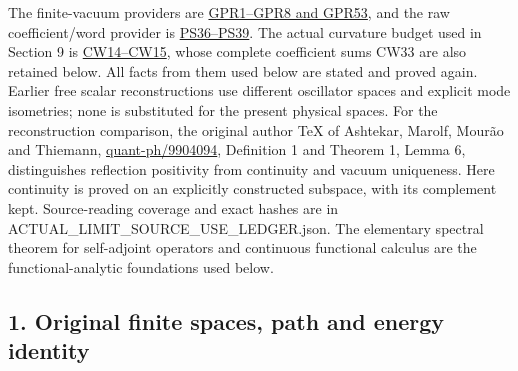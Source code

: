 \documentclass[11pt]{article}
\begin{document}
The finite-vacuum providers are \href{https://github.com/KokunoYumeto/yang-mills-interacting-workbench/blob/af1715c22ac52ba5fcc1d3768f2c6f0895de79ac/yang-mills/continuations/20261011-central-signs-shrinking-window/GLOBAL_PHYSICAL_RESPONSE.md}{GPR1–GPR8 and GPR53}, and the raw coefficient/word provider is \href{https://github.com/KokunoYumeto/yang-mills-interacting-workbench/blob/af1715c22ac52ba5fcc1d3768f2c6f0895de79ac/yang-mills/continuations/20261011-central-signs-shrinking-window/POLYNOMIAL_SCORE_AND_ORIGINAL_ENDPOINT.md}{PS36–PS39}. The actual curvature budget used in Section 9 is \href{https://github.com/KokunoYumeto/yang-mills-interacting-workbench/blob/dbbcbaf7e8d50e41f7491dc9bbed1c0c6ed54b0c/yang-mills/continuations/20261011-central-signs-shrinking-window/CURVATURE_ROOTED_WORDS.md}{CW14–CW15}, whose complete coefficient sums CW33 are also retained below. All facts from them used below are stated and proved again. Earlier free scalar reconstructions use different oscillator spaces and explicit mode isometries; none is substituted for the present physical spaces. For the reconstruction comparison, the original author TeX of Ashtekar, Marolf, Mourão and Thiemann, \href{https://arxiv.org/abs/quant-ph/9904094}{quant-ph/9904094}, Definition 1 and Theorem 1, Lemma 6, distinguishes reflection positivity from continuity and vacuum uniqueness. Here continuity is proved on an explicitly constructed subspace, with its complement kept. Source-reading coverage and exact hashes are in ACTUAL\_LIMIT\_SOURCE\_USE\_LEDGER.json. The elementary spectral theorem for self-adjoint operators and continuous functional calculus are the functional-analytic foundations used below.

\subsection*{1. Original finite spaces, path and energy identity}
\end{document}
